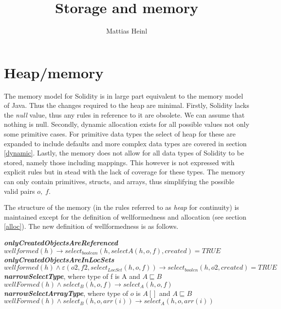 \documentclass{article}
\title{Storage and memory}
\author{Mattias Heinl}
\date{}
\begin{document}
	
	\maketitle
	
	\section{Heap/memory}
	The memory model for Solidity is in large part equivalent to the memory model of Java. Thus the changes required to the heap are minimal. Firstly, Solidity lacks the \textit{null} value, thus any rules in reference to it are obsolete. We can assume that nothing is null. Secondly, dynamic allocation exists for all possible values not only some primitive cases. For primitive data types the select of heap for these are expanded to include defaults and more complex data types are covered in section \ref{dynamic}. Lastly, the memory does not allow for all data types of Solidity to be stored, namely those including mappings. This however is not expressed with explicit rules but in stead with the lack of coverage for these types. The memory can only contain primitives, structs, and arrays, thus simplifying the possible valid pairs $o,\; f$.
	
	The structure of the memory (in the rules referred to as \textit{heap} for continuity) is maintained except for the definition of wellformedness and allocation (see section \ref{alloc}). The new definition of wellformedness is as follows. 

	\textit{\textbf{onlyCreatedObjectsAreReferenced}} \\
	$wellformed(h) \to select_{boolean} (h,selectA (h,o,f), created) = TRUE$ \\
	
	\textit{\textbf{onlyCreatedObjectsAreInLocSets}} \\
	$wellformed(h) \land \varepsilon (o2, f2,select_{LocSet}(h,o, f)) \to  select_{boolen}(h,o2, created) = TRUE $\\
		
	\textit{\textbf{narrowSelectType}},  where type of f is A and $A \sqsubseteq B$ \\
	$wellFormed(h) \land select_B(h,o, f) \to select_A(h,o, f)$\\
		
	\textit{\textbf{narrowSelectArrayType}},  where type of $o$ is $A[]$ and $A \sqsubseteq B$  \\
	$wellFormed(h) \land select_B(h,o,arr(i)) \to select_A(h,o,arr(i))$\\
	
\end{document}
